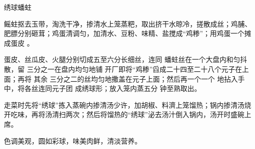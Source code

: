 \begin{recipe}{绣球蟠蛀}

\ingredients


\cooking

\step 鳐蛀抠去玉带，淘洗干净，掺清水上笼蒸粑，取出挤干水晾冷，搓散成丝；鸡脯、
肥膘分别砸茸；鸡蛋清调匀，加清水、豆粉、味精、盐搅成“鸡糁”；用鸡蛋一个摊成蛋皮
。

蛋皮、丝瓜皮、火腿分别切成五至六分长细丝，连同 蟠蛀丝在一个大盘内和匀抖散，留
三分之一在盘内均匀地铺 开厂即将“鸡糁”舀成二十四至二十八个元子在上面；再将 其余
三分之二的丝均匀地撒盖在元子上面；然后再一个一个 地拈入手中，将各丝连同元子团
成绣球形；放入笼内蒸五分 钟至熟取出。

\step 走菜时先将“绣球”拣入蒸碗内掺清汤少许，加胡椒、料濟上笼馏热；锅内掺清汤烧
开吃味，再将汤清扫两次；然后将馏热的“绣球”泌去汤汁倒入锅内，汤开时盛碗上席。

\notes

色调美观，圆如彩球，味美肉鲜，清淡营养。

\end{recipe}

